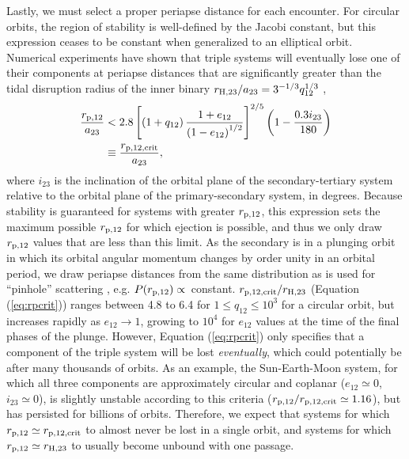 \documentclass[a4paper,twocolumn]{emulateapj}
\begin{document}
{Lastly, we must select a proper periapse distance for each encounter. For circular orbits, the region of stability is well-defined by the Jacobi constant, but this expression ceases to be constant when generalized to an elliptical orbit. Numerical experiments have shown that triple systems will eventually lose one of their components at periapse distances that are significantly greater than the tidal disruption radius of the inner binary $r_{\rm H,23}/a_{23} = 3^{-1/3} q_{12}^{\smash{1/3}}$ \citep{Mardling:1999a,Mardling:2001a},
\begin{align}
\frac{r_{\rm p,12}}{a_{23}} &< 2.8 \left[\left(1 + q_{12}\right) \frac{1 + e_{12}}{\left(1 - e_{12}\right)^{1/2}}\right]^{2/5} \left(1 - \frac{0.3 i_{23}}{180}\right)\label{eq:rpcrit}\\
&\equiv \frac{r_{\rm p,12,crit}}{a_{23}},\nonumber
\end{align}
where $i_{23}$ is the inclination of the orbital plane of the secondary-tertiary system relative to the orbital plane of the primary-secondary system, in degrees. Because stability is guaranteed for systems with greater $r_{\rm p,12}$, this expression sets the maximum possible $r_{\rm p,12}$ for which ejection is possible, and thus we only draw $r_{\rm p,12}$ values that are less than this limit. As the secondary is in a plunging orbit in which its orbital angular momentum changes by order unity in an orbital period, we draw periapse distances from the same distribution as is used for ``pinhole'' scattering \citep{Lightman:1977a}, e.g. $P(r_{\rm p,12}) \propto$~\mbox{constant}. $r_{\rm p,12,crit}/r_{\rm H,23}$ (Equation (\ref{eq:rpcrit})) ranges between 4.8 to 6.4 for $1 \leq q_{12} \leq 10^{3}$ for a circular orbit, but increases rapidly as $e_{12} \rightarrow 1$, growing to $10^{4}$ for $e_{12}$ values at the time of the final phases of the plunge. However, Equation (\ref{eq:rpcrit}) only specifies that a component of the triple system will be lost {\it eventually}, which could potentially be after many thousands of orbits. As an example, the Sun-Earth-Moon system, for which all three components are approximately circular and coplanar ($e_{12} \simeq 0$, $i_{23} \simeq 0$), is slightly unstable according to this criteria ($r_{\rm p,12}/r_{\rm p,12,crit} \simeq 1.16$), but has persisted for billions of orbits. Therefore, we expect that systems for which $r_{\rm p,12} \simeq r_{\rm p,12,crit}$ to almost never be lost in a single orbit, and systems for which $r_{\rm p,12} \simeq r_{\rm H,23}$ to usually become unbound with one passage.

}
\end{document}
